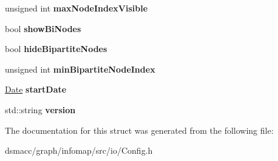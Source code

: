 \begin{DoxyCompactItemize}
unsigned int {\bfseries max\+Node\+Index\+Visible}
\item 
\mbox{\label{structConfig_acf467d57992dc35d4db0b9760960cf39}} 
bool {\bfseries show\+Bi\+Nodes}
\item 
\mbox{\label{structConfig_a2ca0d0ad1e056347cb2d532a3d2780d5}} 
bool {\bfseries hide\+Bipartite\+Nodes}
\item 
\mbox{\label{structConfig_a8de8916bb744da22518cfc3be2dd7e6b}} 
unsigned int {\bfseries min\+Bipartite\+Node\+Index}
\item 
\mbox{\label{structConfig_a319e89b19f7c55b8957e77639e1b12b2}} 
\mbox{\hyperlink{classDate}{Date}} {\bfseries start\+Date}
\item 
\mbox{\label{structConfig_a010bf528b38d9542632881c61aec17e2}} 
std\+::string {\bfseries version}
\end{DoxyCompactItemize}


The documentation for this struct was generated from the following file\+:\begin{DoxyCompactItemize}
\item 
dsmacc/graph/infomap/src/io/Config.\+h\end{DoxyCompactItemize}

